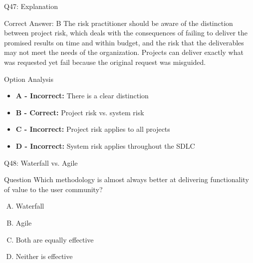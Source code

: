 \documentclass{beamer}
\begin{document}
	\begin{frame}{Q47: Explanation}
		\begin{block}{Correct Answer: B}
			The risk practitioner should be aware of the distinction between project risk, which deals with the consequences of failing to deliver the promised results on time and within budget, and the risk that the deliverables may not meet the needs of the organization. Projects can deliver exactly what was requested yet fail because the original request was misguided.
		\end{block}
		\begin{block}{Option Analysis}
			\begin{itemize}
				\item \textbf{A - Incorrect:} There is a clear distinction
				\item \textbf{B - Correct:} Project risk vs. system risk
				\item \textbf{C - Incorrect:} Project risk applies to all projects
				\item \textbf{D - Incorrect:} System risk applies throughout the SDLC
			\end{itemize}
		\end{block}
	\end{frame}
	
	\begin{frame}{Q48: Waterfall vs. Agile}
		\begin{block}{Question}
			Which methodology is almost always better at delivering functionality of value to the user community?
		\end{block}
		\begin{enumerate}[(A)]
			\item Waterfall
			\item Agile
			\item Both are equally effective
			\item Neither is effective
		\end{enumerate}
	\end{frame}
	
\end{document}
